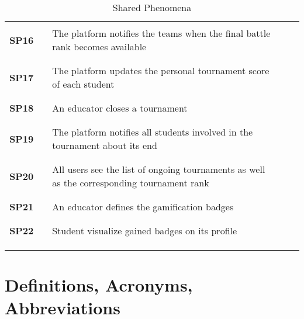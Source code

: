 \begin{longtable}[H]{l l p{8.5cm} l l}
                      & & & & \\\hline & & & & \\
        \textbf{SP16} & \vline & The platform notifies the teams when the final battle rank becomes available & \vline & \\
                      & & & & \\\hline & & & & \\
        \textbf{SP17} & \vline & The platform updates the personal tournament score of each student & \vline & \\
                      & & & & \\\hline & & & & \\
        \textbf{SP18} & \vline & An educator closes a tournament & \vline & \\
                      & & & & \\\hline & & & & \\
        \textbf{SP19} & \vline & The platform notifies all students involved in the tournament about its end & \vline & \\
                      & & & & \\\hline & & & & \\
        \textbf{SP20} & \vline & All users see the list of  ongoing tournaments as well as the corresponding tournament rank & \vline & \\
                      & & & & \\\hline & & & & \\
        \textbf{SP21} & \vline & An educator defines the gamification badges & \vline & \\
                      & & & & \\\hline & & & & \\
        \textbf{SP22} & \vline & Student visualize gained badges on its profile & \vline & \\
                      & & & & \\
    \hline & & & & \\
\caption{Shared Phenomena}
\end{longtable}
    
\section{Definitions, Acronyms, Abbreviations}

